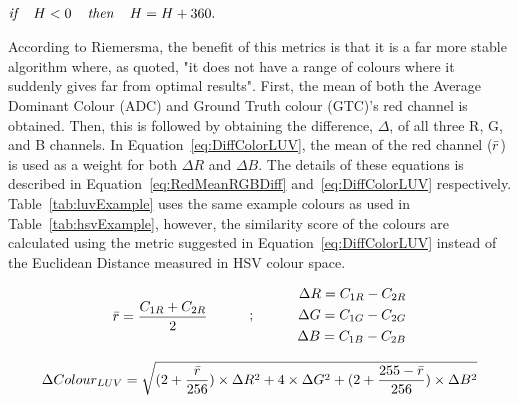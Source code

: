 \centerline{\\$\textit{if } \hspace{.8em}H< 0 \hspace{.8em}\textit{ then } \hspace{.8em}H = H+360.$}




According to Riemersma, the benefit of this metrics is that it is a far more stable algorithm where, as quoted, "it does not have a range of colours where it suddenly gives far from optimal results". First, the mean of both the Average Dominant Colour (ADC) and Ground Truth colour (GTC)'s red channel is obtained. Then, this is followed by obtaining the difference, $\Delta$, of all three R, G, and B channels.
In Equation~\ref{eq:DiffColorLUV}, the mean of the red channel ($\bar{r}$) is used as a weight for both $\Delta{R}$ and $\Delta{B}$. The details of these equations is described in Equation~\ref{eq:RedMeanRGBDiff} and~\ref{eq:DiffColorLUV} respectively. Table~\ref{tab:luvExample} uses the same example colours as used in Table~\ref{tab:hsvExample}, however, the similarity score of the colours are calculated using the metric suggested in Equation~\ref{eq:DiffColorLUV} instead of the Euclidean Distance measured in HSV colour space.

\begin{equation}
\begin{split}
\label{eq:RedMeanRGBDiff}
\bar{r} = \frac{C_{1R} + C_{2R}}{2}
\end{split}
\quad\quad\quad ; \quad\quad\quad
 \begin{split}
\Delta R = C_{1R} - C_{2R}\\
\Delta G = C_{1G} - C_{2G}\\
\Delta B = C_{1B} - C_{2B}
 \end{split}
\end{equation}

\begin{equation}
\label{eq:DiffColorLUV}
\Delta Colour_{LUV} = \sqrt{(2 + \frac{\bar{r}}{256}) \times \Delta R^{2} + 4 \times \Delta G^{2} + (2 + \frac{255 - \bar{r}}{256}) \times \Delta B^{2} }
\end{equation}




